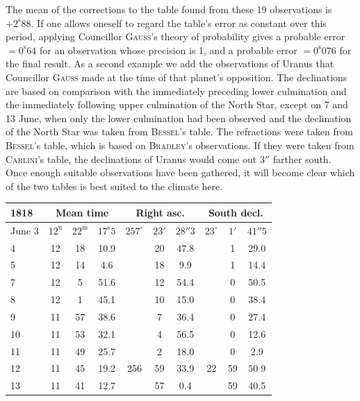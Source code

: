 \par\indent The mean of the corrections to the table found from these 19 observations is $+2^{\mathrm{s}}88$. If one allows oneself to regard the table’s error as constant over this period, applying Councillor \textsc{Gauss}’s theory of probability gives a probable error $=0^{\mathrm{s}}64$ for an observation whose precision is 1, and a probable error $=0^{\mathrm{s}}076$ for the final result. As a second example we add the observations of Uranus that Councillor \textsc{Gauss} made at the time of that planet’s opposition. The declinations are based on comparison with the immediately preceding lower culmination and the immediately following upper culmination of the North Star, except on 7 and 13 June, when only the lower culmination had been observed and the declination of the North Star was taken from \textsc{Bessel}’s table. The refractions were taken from \textsc{Bessel}’s table, which is based on \textsc{Bradley}’s observations. If they were taken from \textsc{Carlini}’s table, the declinations of Uranus would come out $3''$ farther south. Once enough suitable observations have been gathered, it will become clear which of the two tables is best suited to the climate here.

\begin{center}
\setlength{\tabcolsep}{3pt}
\begin{tabular}{l|ccc|ccc|ccc}
\hline
1818 & \multicolumn{3}{c|}{Mean time} & \multicolumn{3}{c|}{Right asc.} & \multicolumn{3}{c}{South decl.} \\
\hline
June 3 & $12^{\mathrm u}$ & $22^{\mathrm m}$ & $17^{\mathrm s}5$ & $257^\circ$ & $23'$ & $28''3$ & $23^\circ$ & $1'$ & $41''5$ \\
4 & 12 & 18 & 10.9 & & 20 & 47.8 & & 1 & 29.0 \\
5 & 12 & 14 & 4.6 & & 18 & 9.9 & & 1 & 14.4 \\
7 & 12 & 5 & 51.6 & & 12 & 54.4 & & 0 & 50.5 \\
8 & 12 & 1 & 45.1 & & 10 & 15.0 & & 0 & 38.4 \\
9 & 11 & 57 & 38.6 & & 7 & 36.4 & & 0 & 27.4 \\
10 & 11 & 53 & 32.1 & & 4 & 56.5 & & 0 & 12.6 \\
11 & 11 & 49 & 25.7 & & 2 & 18.0 & & 0 & 2.9 \\
12 & 11 & 45 & 19.2 & 256 & 59 & 33.9 & 22 & 59 & $50\;9$ \\ 
13 & 11 & 41 & 12.7 & & 57 & 0.4 & & 59 & 40.5 \\
\hline
\end{tabular}
\end{center}

